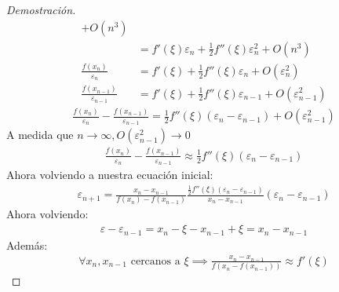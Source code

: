 \documentclass{article}
\begin{document}
\begin{proof}[Demostración]
\begin{equation}
\begin{split}
            +O(n^{3})\\
            &= f'(\xi )\varepsilon _{n} + \frac{1}{2}f''(\xi )\varepsilon _{n}^{2}+O(n^{3})\\
            \frac{f(x_{n})}{\varepsilon _{n}}&=f'(\xi )+\frac{1}{2}f''(\xi )\varepsilon _{n}+O(\varepsilon _{n}^{2})\\
            \frac{f(x_{n-1})}{\varepsilon _{n-1}} &=f'(\xi )+\frac{1}{2}f''(\xi )\varepsilon _{n-1}+O(\varepsilon _{n-1}^{2})
        \end{split}
    \end{equation}
    \begin{equation}
        \begin{split}
            \frac{f(x_{n})}{\varepsilon _{n}}-\frac{f(x_{n-1})}{\varepsilon _{n-1}}
            = \frac{1}{2}f''(\xi )(\varepsilon _{n}-\varepsilon _{n-1})+O(\varepsilon _{n-1}^{2})
        \end{split}
    \end{equation}
    A medida que $n \to \infty,O(\varepsilon _{n-1}^{2}) \to 0$
    \begin{equation}
        \begin{split}
            \frac{f(x_{n})}{\varepsilon _{n}}-\frac{f(x_{n-1})}{\varepsilon _{n-1}}
            \approx \frac{1}{2}f''(\xi )(\varepsilon _{n}-\varepsilon _{n-1})
        \end{split}
    \end{equation}
    Ahora volviendo a nuestra ecuación inicial:
    \begin{equation}
        \begin{split}
            \varepsilon _{n+1} = \frac{x_{n}-x_{n-1}}{f(x_{n})-f(x_{n-1})}
            \frac{\frac{1}{2}f''(\xi )(\varepsilon _{n}-\varepsilon _{n-1})}{x_{n}-x_{n-1}}(\varepsilon _{n}-\varepsilon _{n-1})
        \end{split}
    \end{equation}
    Ahora volviendo:
    \begin{equation}
        \begin{split}
            \varepsilon -\varepsilon _{n-1} = x_{n}-\xi -x_{n-1}+\xi =x_{n}-x_{n-1}
        \end{split}
    \end{equation}
    Además:
    \begin{equation}
        \begin{split}
            \forall x_{n},x_{n-1} \text{ cercanos a }\xi \implies \frac{x_{n}-x_{n-1}}{f(x_{n}-f(x_{n-1}))} \approx f'(\xi )
        \end{split}

\end{equation}
\end{proof}
\end{document}

